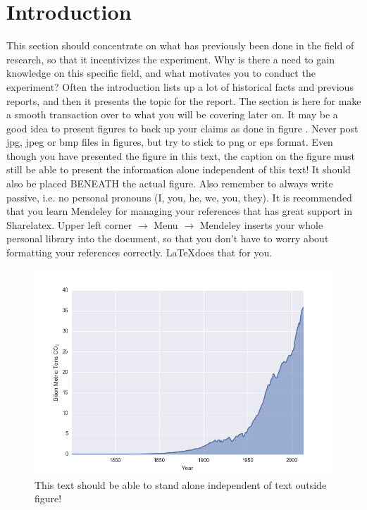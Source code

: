 \section{Introduction}
\label{sec:introduction}
\FloatBarrier %
This section should concentrate on what has previously been done in the field of research, so that it incentivizes the experiment. Why is there a need to gain knowledge on this specific field, and what motivates you to conduct the experiment? Often the introduction lists up a lot of historical facts and previous reports, and then it presents the topic for the report. The section is here for make a smooth transaction over to what you will be covering later on. It may be a good idea to present figures to back up your claims as done in figure . Never post jpg, jpeg or bmp files in figures, but try to stick to png or eps format. Even though you have presented the figure in this text, the caption on the figure must still be able to present the information alone independent of this text! It should also be placed BENEATH the actual figure. Also remember to always write passive, i.e. no personal pronouns (I, you, he, we, you, they). It is recommended that you learn Mendeley for managing your references that has great support in Sharelatex. Upper left corner $\rightarrow$ Menu $\rightarrow$ Mendeley inserts your whole personal library into the document, so that you don't have to worry about formatting your references correctly. \LaTeX does that for you.
\begin{figure}[htb] %
    \centering
    \includegraphics[scale=0.45]{Introduction/figures/Historic_CO2_Emission}
    \caption{This text should be able to stand alone independent of text outside figure!}
    \label{fig:intro_co2}
\end{figure}